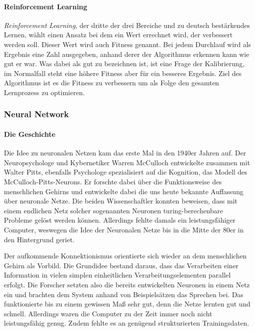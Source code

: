 \paragraph{Reinforcement Learning}
\textit{Reinforcement Learning}, der dritte der drei Bereiche und zu deutsch bestärkendes Lernen, wählt einen Ansatz bei dem ein Wert errechnet wird, der verbessert werden soll. Dieser Wert wird auch Fitness genannt. Bei jedem Durchlauf wird als Ergebnis eine Zahl ausgegeben, anhand derer der Algorithmus erkennen kann wie gut er war. Was dabei als gut zu bezeichnen ist, ist eine Frage der Kalibrierung, im Normalfall steht eine höhere Fitness aber für ein besseres Ergebnis. Ziel des Algorithmus ist es die Fitness zu verbessern um als Folge den gesamten Lernprozess zu optimieren. \cite{M_Reinforcement_3.3.2.1}

\subsubsection{Neural Network}
\paragraph{Die Geschichte} Die Idee zu neuronalen Netzen kam das erste Mal in den 1940er Jahren auf. Der Neuropsychologe und Kybernetiker Warren McCulloch entwickelte zusammen mit Walter Pitts, ebenfalls Psychologe spezialisiert auf die Kognition, das Modell des McCulloch-Pitts-Neurons. Er forschte dabei über die Funktionsweise des menschlichen Gehirns und entwickelte dabei die uns heute bekannte Auffassung über neuronale Netze. Die beiden Wissenschaftler konnten beweisen, dass mit einem endlichen Netz solcher sogenannten Neuronen turing-berechenbare Probleme gelöst werden können. Allerdings fehlte damals ein leistungsfähiger Computer, weswegen die Idee der Neuronalen Netze bis in die Mitte der 80er in den Hintergrund geriet.

Der aufkommende Konnektionismus orientierte sich wieder an dem menschlichen Gehirn als Vorbild. Die Grundidee bestand daraus, dass das Verarbeiten einer Information in vielen simplen einheitlichen Verarbeitungselementen parallel erfolgt. Die Forscher setzten also die bereits entwickelten Neuronen in einem Netz ein und brachten dem System anhand von Beispielsätzen das Sprechen bei. Das funktionierte bis zu einem gewissen Maß sehr gut, denn die Netze lernten gut und schnell. Allerdings waren die Computer zu der Zeit immer noch nicht leistungsfähig genug. Zudem fehlte es an genügend strukturierten Trainingsdaten.

